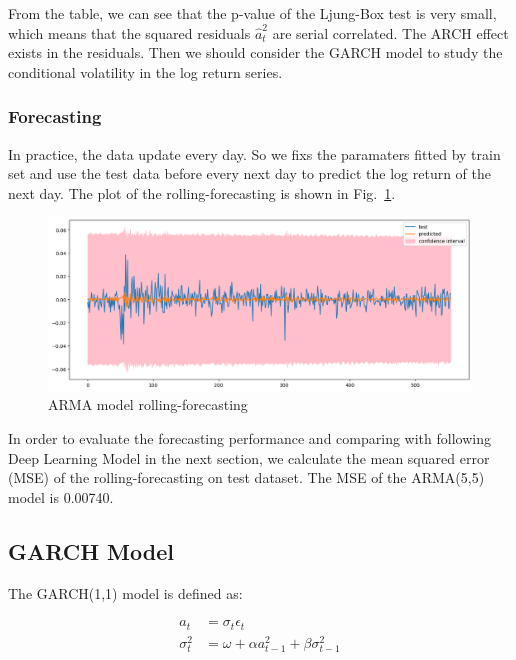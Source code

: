\documentclass[runningheads]{llncs}
\begin{document}
From the table, we can see that the p-value of the Ljung-Box test is very small, which means that the squared residuals $\hat{a}_t^2$ are serial correlated. The ARCH effect exists in the residuals. Then we should consider the GARCH model to study the conditional volatility in the log return series.

\subsubsection{Forecasting}

In practice, the data update every day. So we fixs the paramaters fitted by train set and use the test data before every next day to predict the log return of the next day.
The plot of the rolling-forecasting is shown in Fig.~\ref{fig:8}.


\begin{figure}[htbp]
    \centering
    \includegraphics[width=\textwidth]{../img/arima_forecast.png}
    \caption{ARMA model rolling-forecasting}
    \label{fig:8}
\end{figure}

In order to evaluate the forecasting performance and comparing with following Deep Learning Model in the next section, we calculate the mean squared error (MSE) of the rolling-forecasting on test dataset. The MSE of the ARMA(5,5) model is 0.00740.

\subsection{GARCH Model}

The GARCH(1,1) model is defined as:

$$
    \begin{aligned}
        a_t        & =\sigma_t \epsilon_t                         \\
        \sigma_t^2 & =\omega+\alpha a_{t-1}^2+\beta\sigma_{t-1}^2
    \end{aligned}
$$
\end{document}
